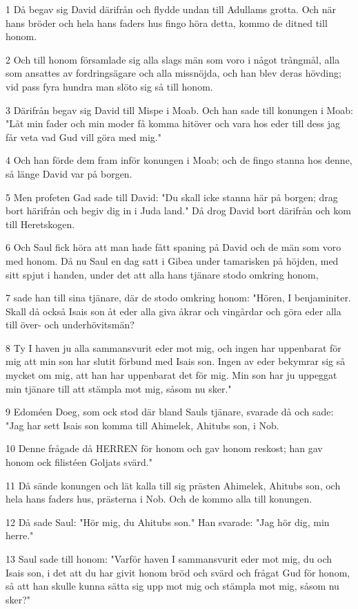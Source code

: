 \par 1 Då begav sig David därifrån och flydde undan till Adullams grotta. Och när hans bröder och hela hans faders hus fingo höra detta, kommo de ditned till honom.
\par 2 Och till honom församlade sig alla slags män som voro i något trångmål, alla som ansattes av fordringsägare och alla missnöjda, och han blev deras hövding; vid pass fyra hundra man slöto sig så till honom.
\par 3 Därifrån begav sig David till Mispe i Moab. Och han sade till konungen i Moab: "Låt min fader och min moder få komma hitöver och vara hos eder till dess jag får veta vad Gud vill göra med mig."
\par 4 Och han förde dem fram inför konungen i Moab; och de fingo stanna hos denne, så länge David var på borgen.
\par 5 Men profeten Gad sade till David: "Du skall icke stanna här på borgen; drag bort härifrån och begiv dig in i Juda land." Då drog David bort därifrån och kom till Heretskogen.
\par 6 Och Saul fick höra att man hade fått spaning på David och de män som voro med honom. Då nu Saul en dag satt i Gibea under tamarisken på höjden, med sitt spjut i handen, under det att alla hans tjänare stodo omkring honom,
\par 7 sade han till sina tjänare, där de stodo omkring honom: "Hören, I benjaminiter. Skall då också Isais son åt eder alla giva åkrar och vingårdar och göra eder alla till över- och underhövitsmän?
\par 8 Ty I haven ju alla sammansvurit eder mot mig, och ingen har uppenbarat för mig att min son har slutit förbund med Isais son. Ingen av eder bekymrar sig så mycket om mig, att han har uppenbarat det för mig. Min son har ju uppeggat min tjänare till att stämpla mot mig, såsom nu sker."
\par 9 Edoméen Doeg, som ock stod där bland Sauls tjänare, svarade då och sade: "Jag har sett Isais son komma till Ahimelek, Ahitubs son, i Nob.
\par 10 Denne frågade då HERREN för honom och gav honom reskost; han gav honom ock filistéen Goljats svärd."
\par 11 Då sände konungen och lät kalla till sig prästen Ahimelek, Ahitubs son, och hela hans faders hus, prästerna i Nob. Och de kommo alla till konungen.
\par 12 Då sade Saul: "Hör mig, du Ahitubs son." Han svarade: "Jag hör dig, min herre."
\par 13 Saul sade till honom: "Varför haven I sammansvurit eder mot mig, du och Isais son, i det att du har givit honom bröd och svärd och frågat Gud för honom, så att han skulle kunna sätta sig upp mot mig och stämpla mot mig, såsom nu sker?"
